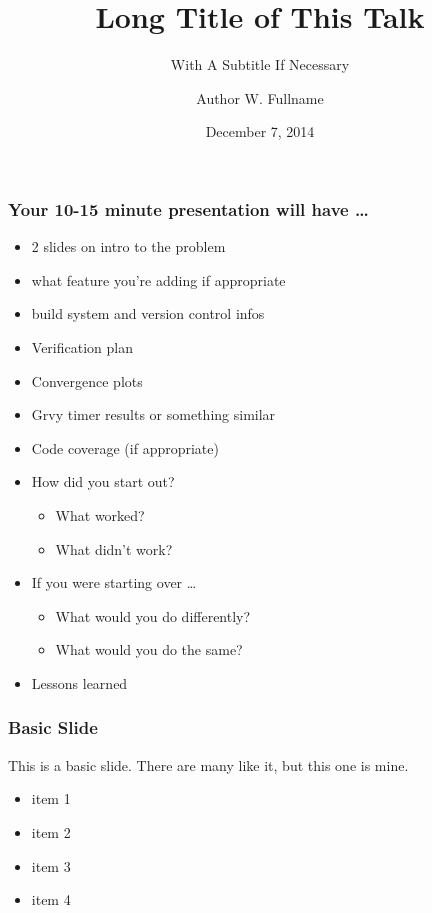 \documentclass[mathserif]{beamer}
\date{December 7, 2014}
\author[A. W. Fullname]{Author W. Fullname}
\institute{The University of Texas at Austin}
\title[Short Title]{Long Title of This Talk}
\subtitle{With A Subtitle If Necessary}
\begin{document}
\begin{frame}
\begin{center}
\end{center}
\titlepage
\begin{flushright}
\end{flushright}
\end{frame}

\begin{frame}
\frametitle{Your 10-15 minute presentation will have \ldots}

\begin{itemize}
\item 2 slides on intro to the problem
\item what feature you're adding if appropriate
\item build system and version control infos
\item Verification plan
\item Convergence plots
\item Grvy timer results or something similar
\item Code coverage (if appropriate)
\item How did you start out?
\begin{itemize}
\item What worked?
\item What didn't work?
\end{itemize}
\item If you were starting over \ldots
\begin{itemize}
\item What would you do differently?
\item What would you do the same?
\end{itemize}
\item Lessons learned
\end{itemize}

\end{frame}

\begin{frame}
\frametitle{Basic Slide}

This is a basic slide. There are many like it, but this one is mine.
\begin{itemize}
\item item 1
\item item 2
\item item 3
\item item 4
\end{itemize}

\end{frame}
\end{document}
